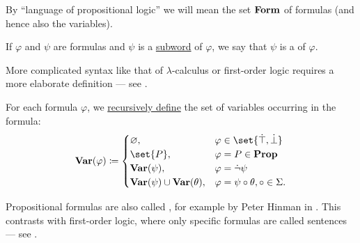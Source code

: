 \begin{definition}
\begin{thmenum}
     By \enquote{language of propositional logic} we will mean the set \( \operatorname{\mathbf{Form}} \) of formulas (and hence also the variables).

     If \( \varphi \) and \( \psi \) are formulas and \( \psi \) is a \hyperref[def:formal_language/subword]{subword} of \( \varphi \), we say that \( \psi \) is a  of \( \varphi \).

    More complicated syntax like that of \( \lambda \)-calculus or first-order logic requires a more elaborate definition --- see .

     For each formula \( \varphi \), we \hyperref[rem:evaluation]{recursively define} the set of variables occurring in the formula:
    \begin{equation}\label{eq:def:propositional_syntax/varables}
      \boldop{Var}(\varphi) \coloneqq \begin{cases}
        \varnothing,                                  &\varphi \in \set{ \syntop, \synbot } \\
        \set{ P },                                    &\varphi = P \in \boldop{Prop} \\
        \boldop{Var}(\psi),                           &\varphi = \synneg \psi \\
        \boldop{Var}(\psi) \cup \boldop{Var}(\theta), &\varphi = \psi \bincirc \theta, \bincirc \in \Sigma.
      \end{cases}
    \end{equation}
  \end{thmenum}
\end{definition}
\begin{comments}
  \item Propositional formulas are also called , for example by Peter Hinman in . This contrasts with first-order logic, where only specific formulas are called sentences --- see .
\end{comments}

